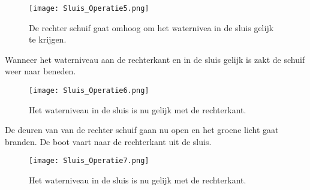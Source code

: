 \documentclass[../verslag.tex]{subfiles}
\begin{document}
\begin{figure}[H]
	\texttt{[image: Sluis\_Operatie5.png]}
	\caption{
		De rechter schuif gaat omhoog om het waternivea in de sluis gelijk te krijgen.
	}
	\label{sluis_op5}
\end{figure}

Wanneer het waterniveau aan de rechterkant en in de sluis gelijk is zakt de schuif weer naar beneden.

\begin{figure}[H]
	\texttt{[image: Sluis\_Operatie6.png]}
	\caption{
		Het waterniveau in de sluis is nu gelijk met de rechterkant.
	}
	\label{sluis_op6}
\end{figure}

De deuren van van de rechter schuif gaan nu open en het groene licht gaat branden. De boot vaart naar de rechterkant uit de sluis.

\begin{figure}[H]
	\texttt{[image: Sluis\_Operatie7.png]}
	\caption{
		Het waterniveau in de sluis is nu gelijk met de rechterkant.
	}
	\label{sluis_op7}
\end{figure}
\end{document}
